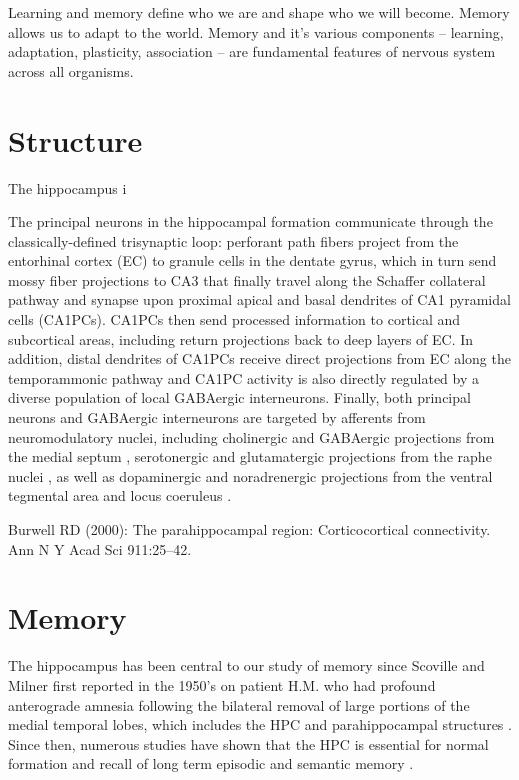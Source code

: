 Learning and memory define who we are and shape who we will become.
Memory allows us to adapt to the world.
Memory and it's various components -- learning, adaptation, plasticity, association -- are fundamental features of nervous system across all organisms.

\section{Structure}
The hippocampus i

The principal neurons in the hippocampal formation communicate through the classically-defined trisynaptic loop: perforant path fibers project from the entorhinal cortex (EC) to granule cells in the dentate gyrus, which in turn send mossy fiber projections to CA3 that finally travel along the Schaffer collateral pathway and synapse upon proximal apical and basal dendrites of CA1 pyramidal cells (CA1PCs).
CA1PCs then send processed information to cortical and subcortical areas, including return projections back to deep layers of EC.
In addition, distal dendrites of CA1PCs receive direct projections from EC along the temporammonic pathway and CA1PC activity is also directly regulated by a diverse population of local GABAergic interneurons.
Finally, both principal neurons and GABAergic interneurons are targeted by afferents from neuromodulatory nuclei, including cholinergic and GABAergic projections from the medial septum  \citep{Klausberger2008}, serotonergic and glutamatergic projections from the raphe nuclei \citep{Varga2009}, as well as dopaminergic and noradrenergic projections from the ventral tegmental area \citep{Gasbarri1997} and locus coeruleus \citep{Foote1983}.


Burwell RD (2000): The parahippocampal region: Corticocortical connectivity. Ann N Y Acad Sci 911:25–42.
\section{Memory}




The hippocampus has been central to our study of memory since Scoville and Milner first reported in the 1950's on patient H.M. who had profound anterograde amnesia following the bilateral removal of large portions of the medial temporal lobes, which includes the HPC and parahippocampal structures \citep{Scoville1957}.
Since then, numerous studies have shown that the HPC is essential for normal formation and recall of long term episodic and semantic memory \citep[reviewd in][]{Eichenbaum2000, Burgess2002}.

